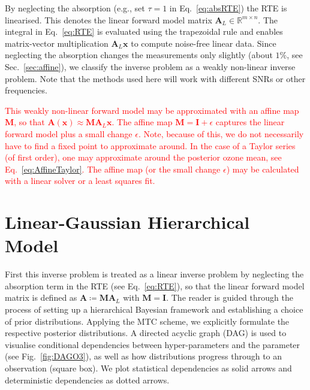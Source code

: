 \documentclass{article}
\begin{document}
By neglecting the absorption (e.g., set $\tau = 1$ in Eq.~\eqref{eq:absRTE}) the RTE is linearised.
This denotes the linear forward model matrix $\bm{A}_L\in \mathbb{R}^{m\times n}$.
The integral in Eq.~\eqref{eq:RTE} is evaluated using the trapezoidal rule and enables matrix-vector multiplication $\bm{A}_L \bm{x}$ to compute noise-free linear data.
Since neglecting the absorption changes the measurements only slightly (about $1\%$, see Sec.~\ref{sec:affine}), we classify the inverse problem as a weakly non-linear inverse problem.
Note that the methods used here will work with different SNRs or other frequencies.

\textcolor{red}{
This weakly non-linear forward model may be approximated with an affine map $\bm{M}$, so that $\bm{A}(\bm{x}) \approx \bm{M}\bm{A}_L\bm{x}$.
The affine map $\bm{M} = \bm{I} + \epsilon$ captures the linear forward model plus a small change $\epsilon$.
Note, because of this, we do not necessarily have to find a fixed point to approximate around.
In the case of a Taylor series (of first order), one may approximate around the posterior ozone mean, see Eq.~\ref{eq:AffineTaylor}.
The affine map (or the small change $\epsilon$) may be calculated with a linear solver or a least squares fit.}

\section{Linear-Gaussian Hierarchical Model}
\label{sec:BayModel}
First this inverse problem is treated as a linear inverse problem by neglecting the absorption term in the RTE (see Eq.~\ref{eq:RTE}), so that the linear forward model matrix is defined as $\bm{A} \coloneqq \bm{M} \bm{A}_L$ with $\bm{M} = \bm{I}$.
The reader is guided through the process of setting up a hierarchical Bayesian framework and establishing a choice of prior distributions.
Applying the MTC scheme, we explicitly formulate the respective posterior distributions.
A directed acyclic graph (DAG) is used to visualise conditional dependencies between hyper-parameters and the parameter (see Fig.~\ref{fig:DAGO3}), as well as how distributions progress through to an observation (square box). 
We plot statistical dependencies as solid arrows and deterministic dependencies as dotted arrows.
\end{document}
